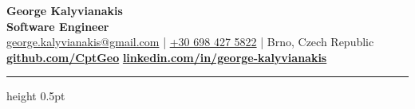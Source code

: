 \documentclass[]{deedy-resume-reversed}
\begin{document}
%
%
\begin{flushleft}
{\fontsize{20}{8}\selectfont \textbf{George Kalyvianakis}}\\
{\textcolor{subheading_gray}{\fontsize{14}{8}\selectfont \textbf{Software Engineer}}} \\
\vspace{6pt}
\href{mailto:george.kalyvianakis@gmail.com}{george.kalyvianakis@gmail.com} | \href{tel:+306984275822}{+30 698 427 5822} | Brno, Czech Republic \\
\vspace{3pt}
\href{https://github.com/CptGeo}{\bf github.com/CptGeo} \textbullet{}
\href{https://www.linkedin.com/in/george-kalyvianakis/}{\bf linkedin.com/in/george-kalyvianakis} \\
\end{flushleft}

\hrule height 0.5pt
\vspace{5pt}

%
%
\end{document}
